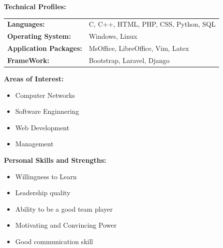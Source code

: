 \documentclass[paper = a4paper, 12pt]{article}
\begin{document}
\vspace{8mm}
{\Large \textbf{ Technical Profiles: } \\
}
\begin{tabular}{l l}
	\textbf{Languages:} & C, C++, HTML, PHP, CSS, Python, SQL \\
	\textbf{Operating System:} & Windows, Linux \\
	\textbf{Application Packages:} & MsOffice, LibreOffice, Vim, Latex \\ 
	\textbf{FrameWork: } & Bootstrap, Laravel, Django \\
	
\end{tabular}

\vspace{8mm}
{\Large \textbf{Areas of Interest:} \\
}
\begin{itemize}\addtolength{\leftskip}{8mm}	
	\item Computer Networks
	\item Software Enginnering
	\item Web Development
	\item Management
\end{itemize}

\vspace{8mm}
{\Large \textbf{Personal Skills and Strengths:}\\
}
\begin{itemize}\addtolength{\leftskip}{8mm}
	\item Willingness to Learn
	\item Leadership quality
	\item Ability to be a good team player
	\item Motivating and Convincing Power
	\item Good communication skill
\end{itemize}

\vspace{8mm}
\end{document}
